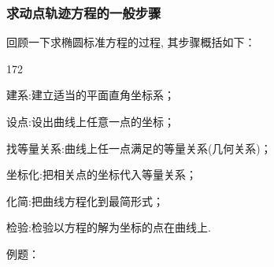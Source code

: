 \subsubsection*{求动点轨迹方程的一般步骤}
回顾一下求椭圆标准方程的过程, 其步骤概括如下：
\begin{dingautolist}{172}
    \item 建系:建立适当的平面直角坐标系；
    \item 设点:设出曲线上任意一点的坐标；
    \item 找等量关系:曲线上任一点满足的等量关系(几何关系)；
    \item 坐标化:把相关点的坐标代入等量关系；
    \item 化简:把曲线方程化到最简形式；
    \item 检验:检验以方程的解为坐标的点在曲线上.
\end{dingautolist}
例题：
